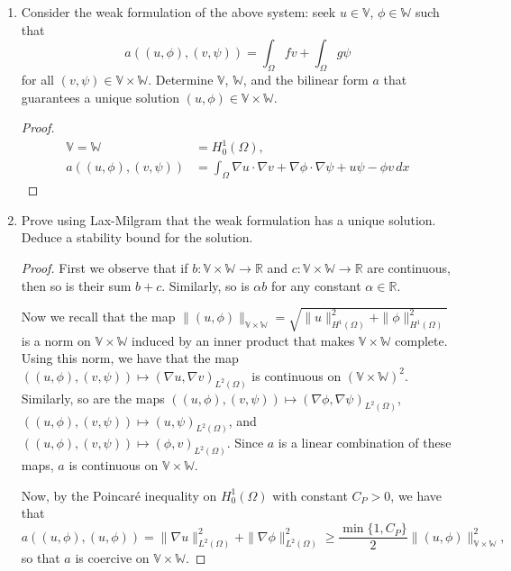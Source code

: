 \documentclass{article}
\begin{document}
\begin{enumerate}
	\item Consider the weak formulation of the above system: seek $u \in \mathbb V$, $\phi \in \mathbb W$ such that
	      \[a((u,\phi),(v,\psi)) = \int_\Omega fv + \int_\Omega g\psi\]
	      for all $(v,\psi) \in \mathbb V \times \mathbb W$.
	      Determine $\mathbb V$, $\mathbb W$, and the bilinear form $a$ that guarantees a unique solution $(u,\phi) \in \mathbb V \times \mathbb W$.
	      \begin{proof}
		      \begin{align*}
			      \mathbb V = \mathbb W & = H^1_0(\Omega),                                                                            \\
			      a((u,\phi),(v,\psi))  & = \int_\Omega \nabla u \cdot \nabla v + \nabla \phi \cdot \nabla \psi + u \psi - \phi v\,dx
		      \end{align*}
	      \end{proof}

	\item Prove using Lax-Milgram that the weak formulation has a unique solution.
	      Deduce a stability bound for the solution.
	      \begin{proof}
		      First we observe that if $b : \mathbb V \times \mathbb W \to \mathbb R$ and $c:\mathbb V \times \mathbb W \to \mathbb R$ are continuous, then so is their sum $b + c$.
		      Similarly, so is $\alpha b$ for any constant $\alpha \in \mathbb R$.

		      Now we recall that the map $\|(u,\phi)\|_{\mathbb V \times \mathbb W} = \sqrt{\|u\|_{H^1(\Omega)}^2 + \|\phi\|_{H^1(\Omega)}^2}$ is a norm on $\mathbb V \times \mathbb W$ induced by an inner product that makes $\mathbb V \times \mathbb W$ complete.
		      Using this norm, we have that the map $((u,\phi),(v,\psi)) \mapsto (\nabla u,\nabla v)_{L^2(\Omega)}$ is continuous on $(\mathbb V \times \mathbb W)^2$.
		      Similarly, so are the maps $((u,\phi),(v,\psi)) \mapsto (\nabla \phi,\nabla \psi)_{L^2(\Omega)}$, $((u,\phi),(v,\psi)) \mapsto (u,\psi)_{L^2(\Omega)}$, and \\ $((u,\phi),(v,\psi)) \mapsto (\phi,v)_{L^2(\Omega)}$.
		      Since $a$ is a linear combination of these maps, $a$ is continuous on $\mathbb V \times \mathbb W$.

		      Now, by the Poincar\'e inequality on $H^1_0(\Omega)$ with constant $C_P > 0$, we have that
		      \[a((u,\phi),(u,\phi)) = \|\nabla u\|_{L^2(\Omega)}^2 + \|\nabla \phi\|_{L^2(\Omega)}^2 \geq \frac{\min\{1,C_P\}}{2}\|(u,\phi)\|_{\mathbb V \times \mathbb W}^2,\]
		      so that $a$ is coercive on $\mathbb V \times \mathbb W$.


\end{proof}
\end{enumerate}
\end{document}
